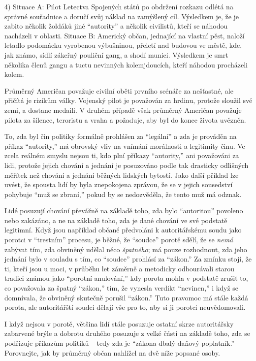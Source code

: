 \documentclass{book}
\begin{document}
4) Situace A: Pilot Letectva Spojených států po obdržení rozkazu odlétá na správné souřadnice a doručí svůj náklad na zamýšlený cíl. Výsledkem je, že je zabito několik žoldáků jiné \enquote{autority} a několik civilistů, kteří se náhodou nacházeli v oblasti. Situace B: Americký občan, jednající na vlastní pěst, naloží letadlo podomácku vyrobenou výbušninou, přeletí nad budovou ve městě, kde, jak známo, sídlí zákeřný pouliční gang, a shodí munici. Výsledkem je smrt několika členů gangu a tuctu nevinných kolemjdoucích, kteří náhodou procházeli kolem.

Průměrný Američan považuje civilní oběti prvního scénáře za nešťastné, ale přičítá je rizikům války. Vojenský pilot je považován za hrdinu, protože sloužil své zemi, a dostane medaili. V druhém případě však průměrný Američan považuje pilota za šílence, teroristu a vraha a požaduje, aby byl do konce života uvězněn.

To, zda byl čin politiky formálně prohlášen za \enquote{legální} a zda je prováděn na příkaz \enquote{autority,} má obrovský vliv na vnímání morálnosti a legitimity činu. Ve zcela reálném smyslu nejsou ti, kdo plní příkazy \enquote{autority,} ani považováni za lidi, protože jejich chování a jednání je posuzováno podle tak drasticky odlišných měřítek než chování a jednání běžných lidských bytostí. Jako další příklad lze uvést, že spousta lidí by byla znepokojena zprávou, že se v jejich sousedství pohybuje \enquote{muž se zbraní,} pokud by se nedozvěděla, že tento muž má odznak.

Lidé posuzují chování převážně na základě toho, zda bylo \enquote{autoritou} povoleno nebo zakázáno, a ne na základě toho, zda je dané chování ve své podstatě legitimní. Když jsou například občané předvoláni k autoritářskému soudu jako porotci v \enquote{trestním} procesu, je běžné, že \enquote{soudce} porotě sdělí, že se \emph{nemá} zabývat tím, zda obviněný udělal něco \emph{špatného}; má pouze rozhodnout, zda jeho jednání bylo v souladu s tím, co \enquote{soudce} prohlásí za \enquote{zákon.} Za zmínku stojí, že ti, kteří jsou u moci, v průběhu let záměrně a metodicky odbourávali starou tradici známou jako \enquote{porotní anulování,} kdy porota mohla v podstatě zrušit to, co považovala za špatný \enquote{zákon,} tím, že vynesla verdikt \enquote{nevinen,} i když se domnívala, že obviněný skutečně porušil \enquote{zákon.} Tuto pravomoc má stále každá porota, ale autoritářští soudci dělají vše pro to, aby si ji porotci neuvědomovali.

I když nejsou v porotě, většina lidí stále posuzuje ostatní skrze autoritářsky zabarvené brýle a dobrotu druhého posuzuje z velké části na základě toho, zda se podřizuje příkazům politiků -- tedy zda je \enquote{zákona dbalý daňový poplatník.} Porovnejte, jak by průměrný občan nahlížel na dvě níže popsané osoby.
\end{document}
